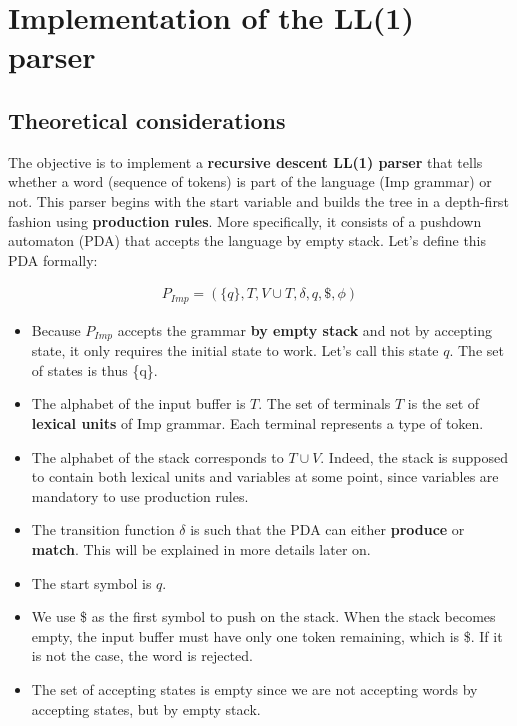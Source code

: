 \chapter{Implementation of the LL(1) parser}

\section{Theoretical considerations}

The objective is to implement a \textbf{recursive descent LL(1) parser} that tells whether a word (sequence of tokens)
is part of the language (Imp grammar) or not. This parser begins with the start variable and builds the
tree in a depth-first fashion using \textbf{production rules}. More specifically, it consists of a pushdown
automaton (PDA) that accepts the language by empty stack. Let's define this PDA formally:

\begin{equation}
  \begin{split}
    P_{Imp} = (\{q\}, T, V \cup T, \delta, q, \$, \phi)
   \end{split}
\end{equation}

\begin{itemize}
  \item Because $P_{Imp}$ accepts the grammar \textbf{by empty stack} and not by accepting state, it only requires the initial state to work. 
        Let's call this state $q$. The set of states is thus \{q\}.
  \item The alphabet of the input buffer is $T$. The set of terminals $T$ is the set of \textbf{lexical units} of Imp grammar. 
        Each terminal represents a type of token.
  \item The alphabet of the stack corresponds to $T \cup V$. Indeed, the stack is supposed to contain both lexical units and variables
        at some point, since variables are mandatory to use production rules.
  \item The transition function $\delta$ is such that the PDA can either \textbf{produce} or \textbf{match}. This will be explained
        in more details later on.
  \item The start symbol is $q$.
  \item We use \$ as the first symbol to push on the stack. When the stack becomes empty, the input buffer must have only one token
        remaining, which is \$. If it is not the case, the word is rejected.
  \item The set of accepting states is empty since we are not accepting words by accepting states, but by empty stack.
\end{itemize}

